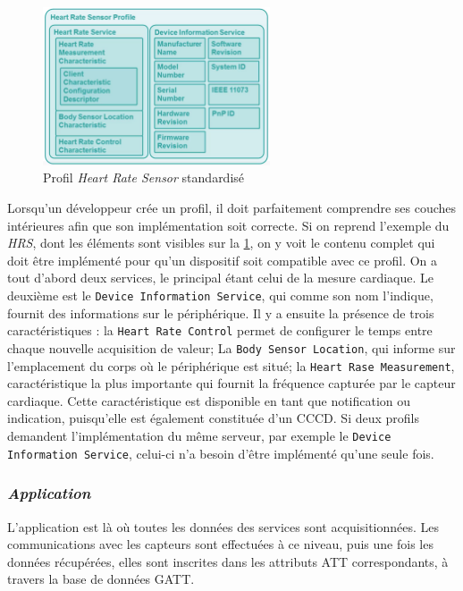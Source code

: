 \begin{figure}[ht!]
\centering
\includegraphics[width=0.6\textwidth]{Figures/Protocols/Bluetooth/heart_rate_sensor_profile.png}
\caption{Profil \textit{Heart Rate Sensor} standardisé}
\label{fig-heart_rate_sensor_profile}
\end{figure}

Lorsqu'un développeur crée un profil, il doit parfaitement comprendre ses couches intérieures afin que son implémentation soit correcte. Si on reprend l'exemple du \textit{HRS}, dont les éléments sont visibles sur la \cref{fig-heart_rate_sensor_profile}, on y voit le contenu complet qui doit être implémenté pour qu'un dispositif soit compatible avec ce profil. On a tout d'abord deux services, le principal étant celui de la mesure cardiaque. Le deuxième est le \texttt{Device Information Service}, qui comme son nom l'indique, fournit des informations sur le périphérique. Il y a ensuite la présence de trois caractéristiques : la \texttt{Heart Rate Control} permet de configurer le temps entre chaque nouvelle acquisition de valeur; La \texttt{Body Sensor Location}, qui informe sur l'emplacement du corps où le périphérique est situé; la \texttt{Heart Rase Measurement}, caractéristique la plus importante qui fournit la fréquence capturée par le capteur cardiaque. Cette caractéristique est disponible en tant que notification ou indication, puisqu'elle est également constituée d'un CCCD. Si deux profils demandent l'implémentation du même serveur, par exemple le \texttt{Device Information Service}, celui-ci n'a besoin d'être implémenté qu'une seule fois.


\subsubsection{\textit{Application}}

L'application est là où toutes les données des services sont acquisitionnées. Les communications avec les capteurs sont effectuées à ce niveau, puis une fois les données récupérées, elles sont inscrites dans les attributs ATT correspondants, à travers la base de données GATT.


